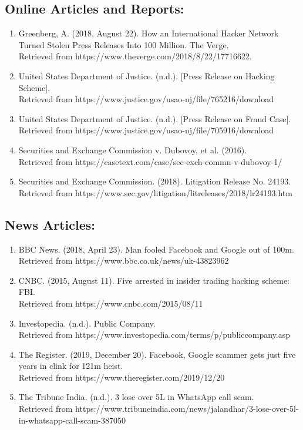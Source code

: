 \documentclass[11pt]{article}
\begin{document}
\subsection*{Online Articles and Reports:}
\begin{enumerate}
    \item Greenberg, A. (2018, August 22). How an International Hacker Network Turned Stolen Press Releases Into 100 Million. The Verge. \\
    Retrieved from https://www.theverge.com/2018/8/22/17716622.
    \item United States Department of Justice. (n.d.). [Press Release on Hacking Scheme]. \\
    Retrieved from https://www.justice.gov/usao-nj/file/765216/download
    \item United States Department of Justice. (n.d.). [Press Release on Fraud Case]. \\
    Retrieved from https://www.justice.gov/usao-nj/file/705916/download
    \item Securities and Exchange Commission v. Dubovoy, et al. (2016). \\
    Retrieved from https://casetext.com/case/sec-exch-commn-v-dubovoy-1/
    \item Securities and Exchange Commission. (2018). Litigation Release No. 24193. \\
    Retrieved from https://www.sec.gov/litigation/litreleases/2018/lr24193.htm
\end{enumerate}

\subsection*{News Articles:}
\begin{enumerate}
    \item BBC News. (2018, April 23). Man fooled Facebook and Google out of 100m. \\
    Retrieved from https://www.bbc.co.uk/news/uk-43823962
    \item CNBC. (2015, August 11). Five arrested in insider trading hacking scheme: FBI. \\
    Retrieved from https://www.cnbc.com/2015/08/11
    \item Investopedia. (n.d.). Public Company. \\
    Retrieved from https://www.investopedia.com/terms/p/publiccompany.asp
    \item The Register. (2019, December 20). Facebook, Google scammer gets just five years in clink for 121m heist. \\
    Retrieved from https://www.theregister.com/2019/12/20
    \item The Tribune India. (n.d.). 3 lose over 5L in WhatsApp call scam. \\
    Retrieved from https://www.tribuneindia.com/news/jalandhar/3-lose-over-5l-in-whatsapp-call-scam-387050
\end{enumerate}
\end{document}
